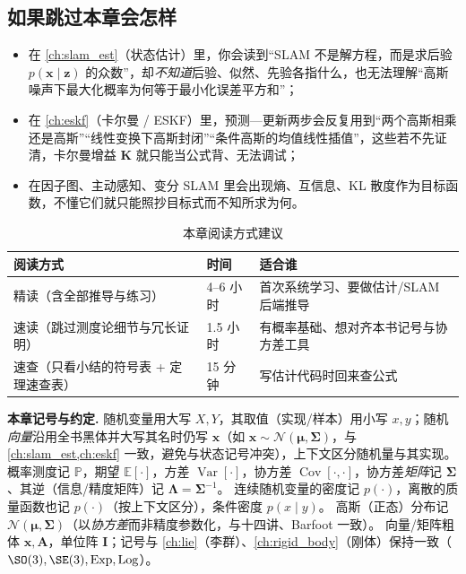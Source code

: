 \subsection*{如果跳过本章会怎样}
\begin{itemize}
  \item 在 \cref{ch:slam_est}（状态估计）里，你会读到“SLAM 不是解方程，而是求后验 $p(\mathbf{x}\mid\mathbf{z})$ 的众数”，却\emph{不知道}后验、似然、先验各指什么，也无法理解“高斯噪声下最大化概率为何等于最小化误差平方和”；
  \item 在 \cref{ch:eskf}（卡尔曼 / ESKF）里，预测—更新两步会反复用到“两个高斯相乘还是高斯”“线性变换下高斯封闭”“条件高斯的均值线性插值”，这些若不先证清，卡尔曼增益 $\mathbf{K}$ 就只能当公式背、无法调试；
  \item 在因子图、主动感知、变分 SLAM 里会出现熵、互信息、KL 散度作为目标函数，不懂它们就只能照抄目标式而不知所求为何。
\end{itemize}

\begin{table}[H]\centering\small
\caption{本章阅读方式建议}
\begin{tabular}{lll}
\toprule
阅读方式 & 时间 & 适合谁 \\
\midrule
精读（含全部推导与练习） & 4--6 小时 & 首次系统学习、要做估计/SLAM 后端推导 \\
速读（跳过测度论细节与冗长证明） & 1.5 小时 & 有概率基础、想对齐本书记号与协方差工具 \\
速查（只看小结的符号表 + 定理速查表） & 15 分钟 & 写估计代码时回来查公式 \\
\bottomrule
\end{tabular}
\end{table}

\begin{note}
\textbf{本章记号与约定.}\;
随机变量用大写 $X,Y$，其取值（实现/样本）用小写 $x,y$；随机\emph{向量}沿用全书黑体并大写其名时仍写 $\mathbf{x}$（如 $\mathbf{x}\sim\mathcal{N}(\boldsymbol{\mu},\boldsymbol{\Sigma})$，与 \cref{ch:slam_est,ch:eskf} 一致，避免与状态记号冲突），上下文区分随机量与其实现。
概率测度记 $\mathbb{P}$，期望 $\mathbb{E}[\cdot]$，方差 $\operatorname{Var}[\cdot]$，协方差 $\operatorname{Cov}[\cdot,\cdot]$，协方差\emph{矩阵}记 $\boldsymbol{\Sigma}$、其逆（信息/精度矩阵）记 $\boldsymbol{\Lambda}=\boldsymbol{\Sigma}^{-1}$。
连续随机变量的密度记 $p(\cdot)$，离散的质量函数也记 $p(\cdot)$（按上下文区分），条件密度 $p(x\mid y)$。
高斯（正态）分布记 $\mathcal{N}(\boldsymbol{\mu},\boldsymbol{\Sigma})$（以\emph{协方差}而非精度参数化，与十四讲\cite{gaoxiang2019slam14}、Barfoot\cite{barfoot2024state} 一致）。
向量/矩阵粗体 $\mathbf{x},\mathbf{A}$，单位阵 $\mathbf{I}$；记号与 \cref{ch:lie}（李群）、\cref{ch:rigid_body}（刚体）保持一致（$\SO(3),\SE(3),\mathrm{Exp},\mathrm{Log}$）。
\end{note}

